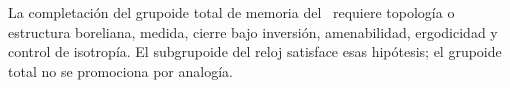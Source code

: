 \begin{workbox}
La completación del grupoide total de memoria del \TPK\ requiere topología
o estructura boreliana, medida, cierre bajo inversión, amenabilidad,
ergodicidad y control de isotropía. El subgrupoide del reloj satisface esas
hipótesis; el grupoide total no se promociona por analogía.
\end{workbox}
